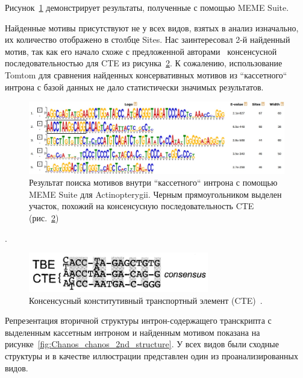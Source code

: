 Рисунок~\ref{fig:Actinopterygii_meme} демонстрирует результаты, полученные с помощью MEME Suite.

Найденные мотивы присутствуют не у всех видов, взятых в анализ изначально, их количество отображено в столбце Sites.
Нас заинтересовал 2-й найденный мотив, так как его начало схоже с предложенной авторами~\cite{cte_consensus} консенсусной последовательностью для CTE из рисунка~\ref{fig:CTE_consensus}.
К сожалению, использование Tomtom для сравнения найденных консервативных мотивов из ``кассетного`` интрона с базой данных не дало статистически значимых результатов.

\begin{figure}[h] %
    \centering
    \includegraphics[width=1.0\textwidth]{images/Actinopterygii_meme_motif}
    \caption{Результат поиска мотивов внутри ``кассетного`` интрона с помощью MEME Suite для Actinopterygii. Черным прямоугольником выделен участок, похожий на консенсусную последовательность CTE (рис.~\ref{fig:CTE_consensus})~\cite{cte_consensus}}
    \label{fig:Actinopterygii_meme}
\end{figure}.

\begin{figure}[H] %
    \centering
    \includegraphics[width=0.7\textwidth]{images/CTE_consensus}
    \caption{Консенсусный конститутивный транспортный элемент (CTE)~\cite{cte_consensus}.}
    \label{fig:CTE_consensus}
\end{figure}

\vspace{1cm}

Репрезентация вторичной структуры интрон-содержащего транскрипта с выделенным кассетным интроном и найденным мотивом показана на рисунке~\ref{fig:Chanos_chanos_2nd_structure}.
У всех видов были сходные структуры и в качестве иллюстрации представлен один из проанализированных видов.

